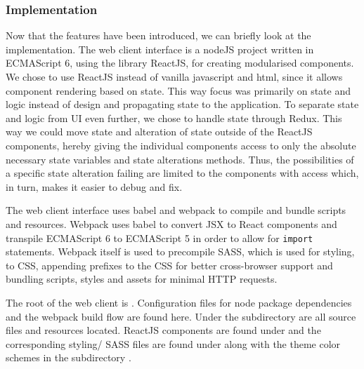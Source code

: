 

\subsubsection{Implementation}

Now that the features have been introduced, we can briefly look at the implementation.
The web client interface is a nodeJS project written in ECMAScript 6, using the library ReactJS, for creating modularised components.
We chose to use ReactJS instead of vanilla javascript and html, since it allows component rendering based on state.
This way focus was primarily on state and logic instead of design and propagating state to the application.
To separate state and logic from UI even further, we chose to handle state through Redux.
This way we could move state and alteration of state outside of the ReactJS components, hereby giving the individual components access to only the absolute necessary state variables and state alterations methods. Thus, the possibilities of a specific state alteration failing are limited to the components with access which, in turn, makes it easier to debug and fix.

The web client interface uses babel and webpack to compile and bundle scripts and resources.
Webpack uses babel to convert JSX to React components and transpile ECMAScript 6 to ECMAScript 5 in order to allow for \texttt{import} statements.
Webpack itself is used to precompile SASS, which is used for styling, to CSS, appending prefixes to the CSS for better cross-browser support and bundling scripts, styles and assets for minimal HTTP requests.

The root of the web client is . Configuration files for node package dependencies and the webpack build flow are found here.
Under the subdirectory  are all source files and resources located.
ReactJS components are found under  and the corresponding styling/ SASS files are found under  along with the theme color schemes in the subdirectory .

